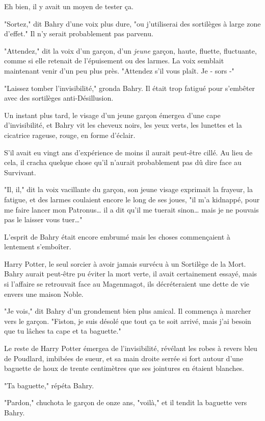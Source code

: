 Eh bien, il y avait un moyen de tester ça.

"Sortez," dit Bahry d'une voix plus dure, "ou j'utiliserai des sortilèges à large zone d'effet." Il n'y serait probablement pas parvenu.

"Attendez," dit la voix d'un garçon, d'un \emph{jeune} garçon, haute, fluette, fluctuante, comme si elle retenait de l'épuisement ou des larmes. La voix semblait maintenant venir d'un peu plus près. "Attendez s'il vous plaît. Je - sors -"

"Laissez tomber l'invisibilité," gronda Bahry. Il était trop fatigué pour s'embêter avec des sortilèges anti-Désillusion.

Un instant plus tard, le visage d'un jeune garçon émergea d'une cape d'invisibilité, et Bahry vit les cheveux noirs, les yeux verts, les lunettes et la cicatrice rageuse, rouge, en forme d'éclair.

S'il avait eu vingt ans d'expérience de moins il aurait peut-être cillé. Au lieu de cela, il cracha quelque chose qu'il n'aurait probablement pas dû dire face au Survivant.

"Il, il," dit la voix vacillante du garçon, son jeune visage exprimait la frayeur, la fatigue, et des larmes coulaient encore le long de ses joues, "il m'a kidnappé, pour me faire lancer mon Patronus… il a dit qu'il me tuerait sinon… mais je ne pouvais pas le laisser vous tuer…"

L'esprit de Bahry était encore embrumé mais les choses commençaient à lentement s'emboîter.

Harry Potter, le seul sorcier à avoir jamais survécu à un Sortilège de la Mort. Bahry aurait peut-être pu éviter la mort verte, il avait certainement essayé, mais si l'affaire se retrouvait face au Magenmagot, ils décréteraient une dette de vie envers une maison Noble.

"Je vois," dit Bahry d'un grondement bien plus amical. Il commença à marcher vers le garçon. "Fiston, je suis désolé que tout ça te soit arrivé, mais j'ai besoin que tu lâches ta cape et ta baguette."

Le reste de Harry Potter émergea de l'invisibilité, révélant les robes à revers bleu de Poudlard, imbibées de sueur, et sa main droite serrée si fort autour d'une baguette de houx de trente centimètres que ses jointures en étaient blanches.

"Ta baguette," répéta Bahry.

"Pardon," chuchota le garçon de onze ans, "voilà," et il tendit la baguette vers Bahry.

